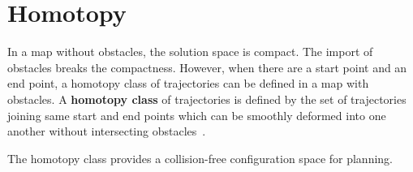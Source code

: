\section{Homotopy}

In a map without obstacles, the solution space is compact.
The import of obstacles breaks the compactness.
However, when there are a start point and an end point, a homotopy class of trajectories can be defined in a map with obstacles.
A \textbf{homotopy class} of trajectories is defined by the set of trajectories joining same start and end points which can be smoothly deformed into one another without intersecting obstacles~\cite{bhattacharya2010search}.

The homotopy class provides a collision-free configuration space for planning.